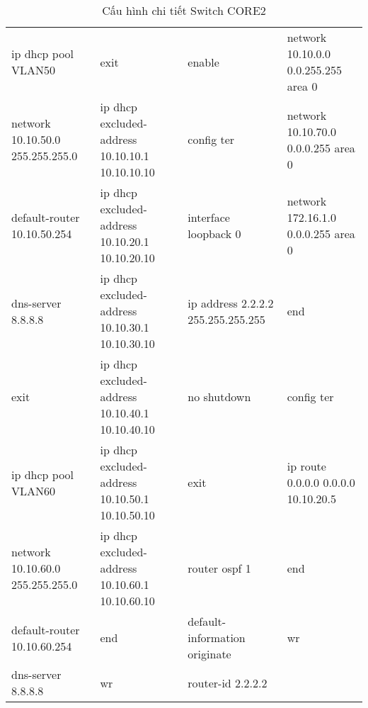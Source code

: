 \begin{table}[H]
\centering
\begin{tabular}{|p{4cm}|p{4cm}|p{4cm}|p{4cm}|}
\hline
ip dhcp pool VLAN50&	exit&	enable &	network 10.10.0.0 0.0.255.255 area 0\\
network 10.10.50.0 255.255.255.0	&ip dhcp excluded-address 10.10.10.1 10.10.10.10	&config ter	&network 10.10.70.0 0.0.0.255 area 0\\
default-router 10.10.50.254	&ip dhcp excluded-address 10.10.20.1 10.10.20.10&	interface loopback 0	&network 172.16.1.0 0.0.0.255 area 0\\
dns-server 8.8.8.8&	ip dhcp excluded-address 10.10.30.1 10.10.30.10	&ip address 2.2.2.2 255.255.255.255	&end\\
exit&	ip dhcp excluded-address 10.10.40.1 10.10.40.10	&no shutdown&config ter\\
ip dhcp pool VLAN60	&ip dhcp excluded-address 10.10.50.1 10.10.50.10&	exit&	ip route 0.0.0.0 0.0.0.0 10.10.20.5\\
network 10.10.60.0 255.255.255.0	&ip dhcp excluded-address 10.10.60.1 10.10.60.10	&router ospf 1&	end\\
default-router 10.10.60.254	&end&	default-information originate&	wr\\
dns-server 8.8.8.8	&wr	&router-id 2.2.2.2&	\\
\hline
\end{tabular}
\caption{Cấu hình chi tiết Switch CORE2}
\end{table}